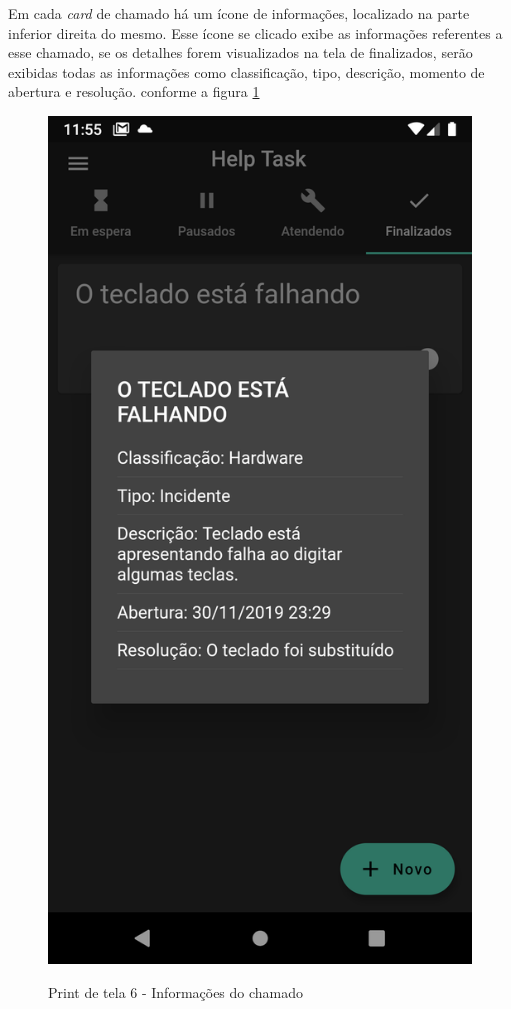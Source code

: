 Em cada \textit{card} de chamado há um ícone de informações, localizado na parte inferior direita do mesmo. Esse ícone se clicado exibe as informações referentes a esse chamado, se os detalhes forem visualizados na tela de finalizados, serão exibidas todas as informações como classificação, tipo, descrição, momento de abertura e resolução. conforme a figura \ref{fig:detalhes}

\begin{figure}[htb]
     \caption{Print de tela 6 - Informações do chamado}
     \centering
     \begin{frame}{
     \includegraphics [scale = 0.2]{img/screenshots/detalhes.png}}
     \end{frame}
     \label{fig:detalhes}
 \end{figure}
\newpage


